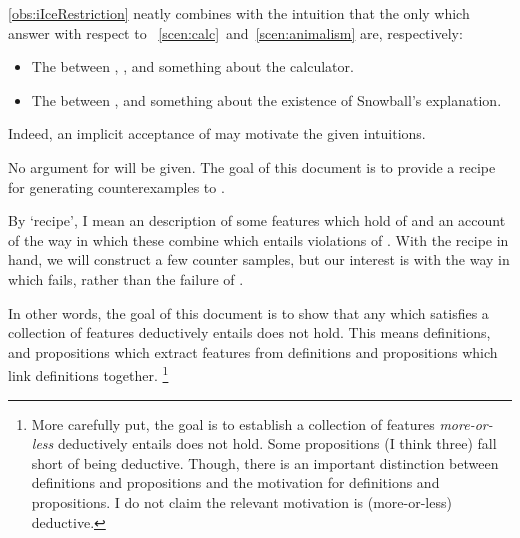 \begin{note}
  \noindent%
  \autoref{obs:iIceRestriction} neatly combines with the intuition that the only  which answer \qWhy{} with respect to ~\ref{scen:calc}~and~\ref{scen:animalism} are, respectively:
  \begin{itemize}
  \item
    The \ros{} between \propM{\gistCalcEq{}}, , and something about the calculator.
  \item
    The \ros{} between ,  and something about the existence of Snowball's explanation.
  \end{itemize}
  Indeed, an implicit acceptance of \issueInclusion{} may motivate the given intuitions.
\end{note}


\begin{note}
  No argument for \issueInclusion{} will be given.
  The goal of this document is to provide a recipe for generating counterexamples to \issueInclusion{}.

  By `recipe', I mean an description of some features which hold of  and an account of the way in which these combine which entails violations of \issueInclusion{}.
  With the recipe in hand, we will construct a few counter samples, but our interest is with the way in which \issueInclusion{} fails, rather than the failure of \issueInclusion{}.

  In other words, the goal of this document is to show that any  which satisfies a collection of features deductively entails \issueInclusion{} does not hold.
  This means definitions, and propositions which extract features from definitions and propositions which link definitions together.%
  \footnote{
    More carefully put, the goal is to establish a collection of features \emph{more-or-less} deductively entails \issueInclusion{} does not hold.
    Some propositions (I think three) fall short of being deductive.
    Though, there is an important distinction between definitions and propositions and the motivation for definitions and propositions.
    I do not claim the relevant motivation is (more-or-less) deductive.
  }




\end{note}

